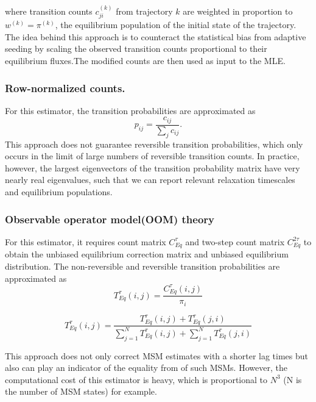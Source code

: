\documentclass[%
 aip,
rsi,%
 amsmath,amssymb,
 reprint,%
]{revtex4-1}
\begin{document}
where transition counts $c_{ji}^{(k)}$ from trajectory $k$ are weighted in proportion to $w^{(k)} = \pi^{(k)}$, the equilibrium population of the initial state of the trajectory.  The idea behind this approach is to counteract the statistical bias from adaptive seeding by scaling the observed transition counts proportional to their equilibrium fluxes.The modified counts are then used as input to the MLE.

\subsubsection{Row-normalized counts.}
For this estimator, the transition probabilities are approximated as
\begin{equation}
p_{ij} = \frac{c_{ij}}{\sum_j c_{ij}}.
\end{equation}
This approach does not guarantee reversible transition probabilities, which only occurs in the limit of large numbers of reversible transition counts.  In practice, however, the largest eigenvectors of the transition probability matrix have very nearly real eigenvalues, such that we can report relevant relaxation timescales and equilibrium populations. 

\subsubsection{Observable operator model(OOM) theory}
For this estimator, it requires count matrix $C_{Eq}^{\tau}$ and two-step count matrix $C_{Eq}^{2\tau}$ to obtain the unbiased equilibrium correction matrix and unbiased equilibrium distribution.\cite{Nuske:2017ex} The non-reversible and reversible transition probabilities are approximated as
\begin{equation}
T_{Eq}^{\tau}(i,j)=\frac{C_{Eq}^{\tau}(i,j)}{\pi_{i}}
\end{equation}

\begin{equation}
T_{Eq}^{\tau}(i,j)=\frac{T_{Eq}^{\tau}(i,j)+T_{Eq}^{\tau}(j,i)}{\sum_{j=1}^{N}T_{Eq}^{\tau}(i,j)+\sum_{j=1}^{N}T_{Eq}^{\tau}(j,i)}
\end{equation}

This approach does not only correct MSM estimates with a shorter lag times but also can play an indicator of the equality from of such MSMs. However, the computational cost of this estimator is heavy, which is proportional to $N^{3}$ (N is the number of MSM states) for example.   
\end{document}
